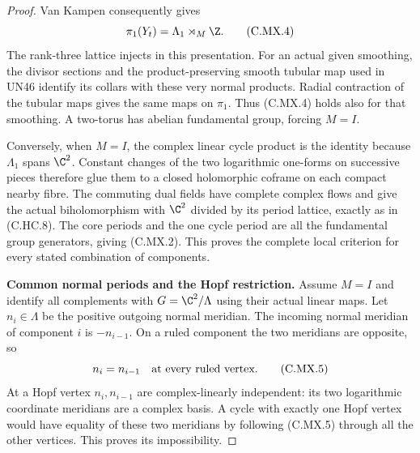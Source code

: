 \begin{proof}
Van Kampen consequently gives
\[
                        \pi_1(Y_t)=\Lambda_1\rtimes_M\Z .
                                                        \tag{C.MX.4}
\]
The rank-three lattice injects in this presentation.
For an actual given smoothing, the divisor sections
and the product-preserving smooth tubular map used
in UN46 identify its collars with these very normal
products. Radial contraction of the tubular maps
gives the same maps on $\pi_1$. Thus (C.MX.4) holds
also for that smoothing. A two-torus has abelian
fundamental group, forcing $M=I$.

Conversely, when $M=I$, the complex linear cycle
product is the identity because $\Lambda_1$
spans $\C^2$. Constant changes of the two logarithmic
one-forms on successive pieces therefore glue them
to a closed holomorphic coframe on each compact
nearby fibre. The commuting dual fields have
complete complex flows and give the actual
biholomorphism with $\C^2$ divided by its period
lattice, exactly as in (C.HC.8). The core periods
and the one cycle period are all the fundamental
group generators, giving (C.MX.2). This proves
the complete local criterion for every stated
combination of components.

\par\medskip\noindent\textbf{Common normal periods and the Hopf restriction.}
Assume $M=I$ and identify all complements with
$G=\C^2/\Lambda$ using their actual linear maps.
Let $n_i\in\Lambda$ be the positive outgoing normal
meridian. The incoming normal meridian of component
$i$ is $-n_{i-1}$. On a ruled component the two
meridians are opposite, so
\[
                      n_i=n_{i-1}
                  \quad\hbox{at every ruled vertex}.   \tag{C.MX.5}
\]
At a Hopf vertex $n_i,n_{i-1}$ are complex-linearly
independent: its two logarithmic coordinate
meridians are a complex basis. A cycle with
exactly one Hopf vertex would have equality of
these two meridians by following (C.MX.5) through
all the other vertices. This proves its impossibility.


\end{proof}
